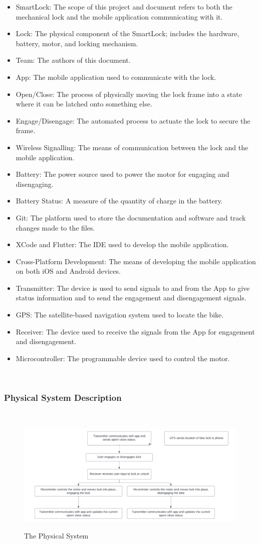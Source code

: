 \documentclass[12pt]{article}
\begin{document}
\begin{itemize}
\item SmartLock: The scope of this project and document refers to both the mechanical lock and the mobile application communicating with it. 
\item Lock: The physical component of the SmartLock; includes the hardware, battery, motor, and locking mechanism.  
\item Team: The authors of this document.
\item App: The mobile application used to communicate with the lock.
\item Open/Close: The process of physically moving the lock frame into a state where it can be latched onto something else. 
\item Engage/Disengage: The automated process to actuate the lock to secure the frame. 
\item Wireless Signalling: The means of communication between the lock and the mobile application. 
\item Battery: The power source used to power the motor for engaging and disengaging. 
\item Battery Status: A measure of the quantity of charge in the battery. 
\item Git: The platform used to store the documentation and software and track changes made to the files. 
\item XCode and Flutter: The IDE used to develop the mobile application. 
\item Cross-Platform Development: The means of developing the mobile application on both iOS and Android devices. 
\item Transmitter: The device is used to send signals to and from the App to give status information and to send the engagement and disengagement signals. 
\item GPS: The satellite-based navigation system used to locate the bike. 
\item Receiver: The device used to receive the signals from the App for engagement and disengagement. 
\item Microcontroller: The programmable device used to control the motor. 
\end{itemize}
~\newpage
\subsubsection{Physical System Description} \label{sec_phySystDescrip}
~\newline
 \begin{figure}[h!]
 \begin{center}
 {
 \includegraphics[width=0.6\linewidth]{../FunctionalDiagram.jpeg}
 }
 \caption{\label{The Physical System} The Physical System}
 \end{center}
 \end{figure}
\end{document}
